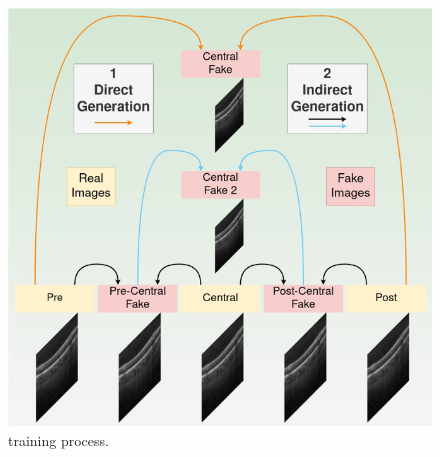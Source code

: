 \begin{figure}[!ht]
	\centering
	\includegraphics[width=0.75\linewidth]{figures/GANGenerationFramework.png}
	\caption{\textcite{Lopez2023} training process.}
	\label{fig:GANGenerationFramework}
\end{figure}

